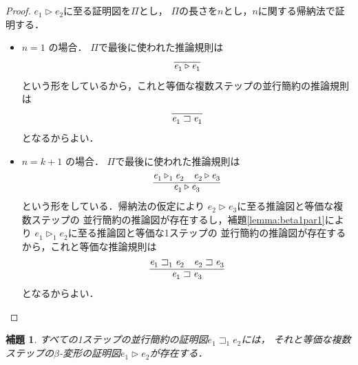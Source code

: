 \documentclass{ltjsbook}%
\newtheorem{lemma}{補題}[section]%
\newcommand\lemmaname{補題}%
\begin{document}
\begin{proof}
  $\mathit{e}_1^{}\triangleright\mathit{e}_2^{}$に至る証明図を$\Pi$とし，%
  $\Pi$の長さを$n$とし，$n$に関する帰納法で証明する．%
  \begin{itemize}%
  \item $n=1$ の場合．%
    $\Pi$で最後に使われた推論規則は%
    \begin{equation}%
      \infer{%
        \mathit{e}_1^{}\triangleright\mathit{e}_1^{}%
      }{%
      }%
    \end{equation}%
    という形をしているから，これと等価な複数ステップの並行簡約の推論規則は%
    \begin{equation}%
      \infer{%
        \mathit{e}_1^{}\sqsupset\mathit{e}_1^{}%
      }{%
      }%
    \end{equation}%
    となるからよい．%
  \item $n=k + 1$ の場合．%
    $\Pi$で最後に使われた推論規則は%
    \begin{equation}%
      \infer{%
        \mathit{e}_1^{}\triangleright\mathit{e}_3^{}%
      }{%
        \mathit{e}_1^{}\triangleright_1^{}\mathit{e}_2^{}%
      &%
        \mathit{e}_2^{}\triangleright\mathit{e}_3^{}%
      }%
    \end{equation}%
    という形をしている．帰納法の仮定により%
    $\mathit{e}_2^{}\triangleright\mathit{e}_3^{}$に至る推論図と等価な複数ステップの%
    並行簡約の推論図が存在するし，\lemmaname\ref{lemma:beta1par1}により%
    $\mathit{e}_1^{}\triangleright_1^{}\mathit{e}_2^{}$に至る推論図と等価な1ステップの%
    並行簡約の推論図が存在するから，これと等価な推論規則は%
    \begin{equation}%
      \infer{%
        \mathit{e}_1^{}\sqsupset\mathit{e}_3^{}%
      }{%
        \mathit{e}_1^{}\sqsupset_1^{}\mathit{e}_2^{}%
      &%
        \mathit{e}_2^{}\sqsupset\mathit{e}_3^{}%
      }%
    \end{equation}%
    となるからよい．%
  \end{itemize}%
\end{proof}%
\begin{lemma}%
  \label{lemma:par1beta}%
  すべての1ステップの並行簡約の証明図$\mathit{e}_1^{}\sqsupset_1^{}\mathit{e}_2^{}$には，%
  それと等価な複数ステップの$\beta$-変形の証明図$\mathit{e}_1^{}\triangleright\mathit{e}_2^{}$が存在する．%
\end{lemma}%
\end{document}
